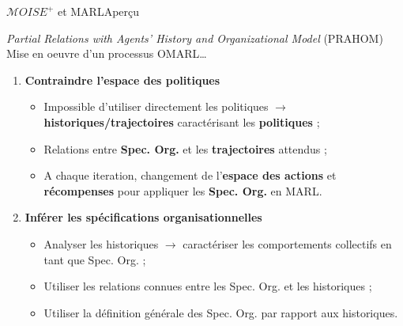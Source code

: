 \begin{frame}{$\mathcal{M}OISE^+$ et MARL}{Aperçu}


    \begin{block}{\emph{Partial Relations with Agents' History and Organizational Model} (PRAHOM)}
        Mise en oeuvre d'un processus OMARL\dots
        \begin{enumerate}
            \item \textbf{Contraindre l'espace des politiques}
                  \begin{itemize}
                      \item Impossible d'utiliser directement les politiques $\rightarrow$ \textbf{historiques/trajectoires} caractérisant les \textbf{politiques} ;
                      \item Relations entre \textbf{Spec. Org.} et les \textbf{trajectoires} attendus ;
                      \item A chaque iteration, changement de l'\textbf{espace des actions} et \textbf{récompenses} pour appliquer les \textbf{Spec. Org.} en MARL.
                  \end{itemize}

            \item \textbf{Inférer les spécifications organisationnelles}
                  \begin{itemize}
                      \item Analyser les historiques $\rightarrow$ caractériser les comportements collectifs en tant que Spec. Org. ;
                      \item Utiliser les relations connues entre les Spec. Org. et les historiques ;
                      \item Utiliser la définition générale des Spec. Org. par rapport aux historiques.
                  \end{itemize}
        \end{enumerate}
    \end{block}
\end{frame}




